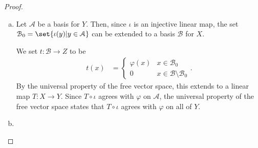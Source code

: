 \begin{proof}\hfill
  \begin{enumerate}[(a)]
    \item Let $\mathcal{A}$ be a basis for $Y$. Then, since $\iota$ is an injective linear map, the set $\mathcal{B}_0 = \set{\iota(y) | y\in \mathcal{A}}$ can be extended to a basis $\mathcal{B}$ for $X$.\newline

      We set $t\colon \mathcal{B}\rightarrow Z$ to be
      \begin{align*}
        t\left(x\right) &= \begin{cases}
          \varphi(x) & x\in \mathcal{B}_0\\
          0 & x\in \mathcal{B}\setminus \mathcal{B}_0
        \end{cases}.
      \end{align*}
      By the universal property of the free vector space, this extends to a linear map $T\colon X\rightarrow Y$. Since $T\circ\iota$ agrees with $\varphi$ on $\mathcal{A}$, the universal property of the free vector space states that $T\circ\iota$ agrees with $\varphi$ on all of $Y$.
    \item 
  \end{enumerate}
\end{proof}

